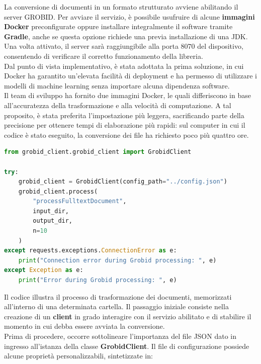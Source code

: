 La conversione di documenti in un formato strutturato avviene abilitando il server GROBID. Per avviare il servizio, è possibile usufruire di alcune \textbf{immagini Docker} preconfigurate oppure installare integralmente il software tramite \textbf{Gradle}, anche se questa opzione richiede una previa installazione di una JDK. Una volta attivato, il server sarà raggiungibile alla porta $8070$ del dispositivo, consentendo di verificare il corretto funzionamento della libreria. \vspace{7pt} \\
Dal punto di vista implementativo, è stata adottata la prima soluzione, in cui Docker ha garantito un'elevata facilità di deployment e ha permesso di utilizzare i modelli di machine learning senza importare alcuna dipendenza software. \vspace{7pt} \\
Il team di sviluppo ha fornito due immagini Docker, le quali differiscono in base all'accuratezza della trasformazione e alla velocità di computazione. A tal proposito, è stata preferita l'impostazione più leggera, sacrificando parte della precisione per ottenere tempi di elaborazione più rapidi: sul computer in cui il codice è stato eseguito, la conversione dei file ha richiesto poco più quattro ore.
\begin{lstlisting}[language=python, caption=Conversione di documenti PDF in file XML/TEI]
from grobid_client.grobid_client import GrobidClient

try:
    grobid_client = GrobidClient(config_path="../config.json")
    grobid_client.process(
        "processFulltextDocument",
        input_dir,
        output_dir,
        n=10
    )        
except requests.exceptions.ConnectionError as e:
    print("Connection error during Grobid processing: ", e)
except Exception as e:
    print("Error during Grobid processing: ", e)\end{lstlisting}
Il codice illustra il processo di trasformazione dei documenti, memorizzati all'interno di una determinata cartella. Il passaggio iniziale consiste nella creazione di un \textbf{client} in grado interagire con il servizio abilitato e di stabilire il momento in cui debba essere avviata la conversione. \vspace{7pt} \\
Prima di procedere, occorre sottolineare l'importanza del file JSON dato in ingresso all'istanza della classe \textbf{GrobidClient}. Il file di configurazione possiede alcune proprietà personalizzabili, sintetizzate in:
